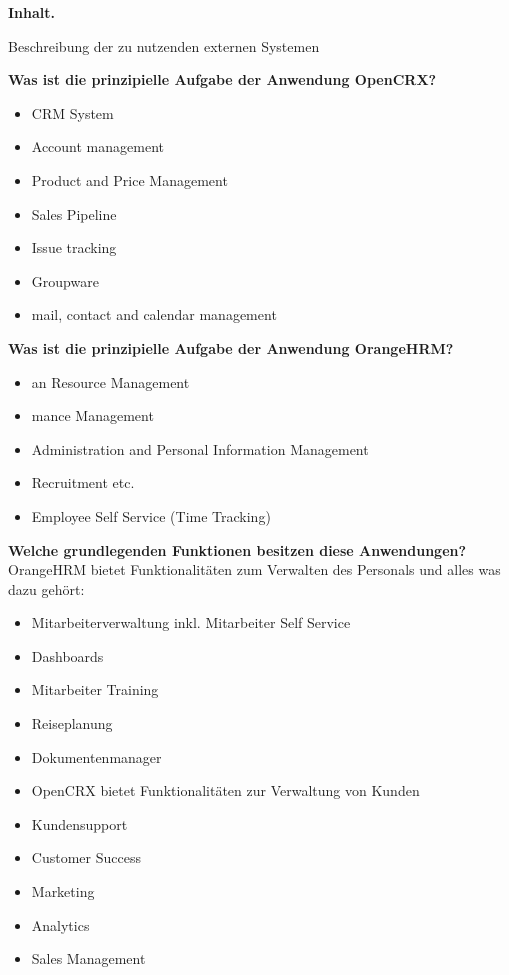\documentclass[]{article}
\begin{document}
\textbf{Inhalt.}

Beschreibung der zu nutzenden externen Systemen

\textbf{Was ist die prinzipielle Aufgabe der Anwendung OpenCRX? }
\begin{itemize}
\item CRM System
\item Account management
\item Product and Price Management
\item Sales Pipeline
\item Issue tracking
\item Groupware
\item mail, contact and calendar management
\end{itemize}

\textbf{Was ist die prinzipielle Aufgabe der Anwendung OrangeHRM? }
\begin{itemize}
	\item an Resource Management
	\item mance Management
	\item  Administration and Personal Information Management
	\item  Recruitment etc.
	\item  Employee Self Service (Time Tracking)
\end{itemize}

\textbf{Welche grundlegenden Funktionen besitzen diese Anwendungen?}
OrangeHRM bietet Funktionalitäten zum Verwalten des Personals und alles was dazu gehört:
\begin{itemize}
	\item Mitarbeiterverwaltung inkl. Mitarbeiter Self Service
	\item Dashboards
	\item Mitarbeiter Training
	\item Reiseplanung
	\item Dokumentenmanager
	\item OpenCRX bietet Funktionalitäten zur Verwaltung von Kunden
	\item Kundensupport
	\item Customer Success
	\item Marketing
	\item Analytics
	\item Sales Management
\end{itemize}
\end{document}
